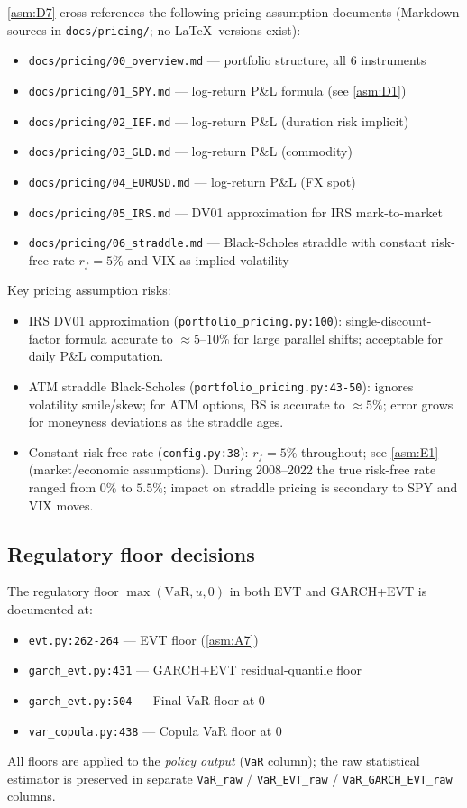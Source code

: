 \documentclass[11pt,a4paper]{article}
\newcommand{\code}[1]{\texttt{#1}}
\begin{document}
\cref{asm:D7} cross-references the following pricing assumption documents
(Markdown sources in \code{docs/pricing/}; no \LaTeX\ versions exist):

\begin{itemize}
  \item \code{docs/pricing/00\_overview.md} --- portfolio structure, all 6 instruments
  \item \code{docs/pricing/01\_SPY.md} --- log-return P\&L formula (see \cref{asm:D1})
  \item \code{docs/pricing/02\_IEF.md} --- log-return P\&L (duration risk implicit)
  \item \code{docs/pricing/03\_GLD.md} --- log-return P\&L (commodity)
  \item \code{docs/pricing/04\_EURUSD.md} --- log-return P\&L (FX spot)
  \item \code{docs/pricing/05\_IRS.md} --- DV01 approximation for IRS mark-to-market
  \item \code{docs/pricing/06\_straddle.md} --- Black-Scholes straddle with constant
    risk-free rate $r_f = 5\%$ and VIX as implied volatility
\end{itemize}

Key pricing assumption risks:
\begin{itemize}
  \item IRS DV01 approximation (\code{portfolio\_pricing.py:100}): single-discount-factor
    formula accurate to $\approx 5$--$10\%$ for large parallel shifts; acceptable for
    daily P\&L computation.
  \item ATM straddle Black-Scholes (\code{portfolio\_pricing.py:43-50}): ignores
    volatility smile/skew; for ATM options, BS is accurate to $\approx 5\%$; error
    grows for moneyness deviations as the straddle ages.
  \item Constant risk-free rate (\code{config.py:38}): $r_f = 5\%$ throughout;
    see \cref{asm:E1} (market/economic assumptions). During 2008--2022 the true
    risk-free rate ranged from $0\%$ to $5.5\%$; impact on straddle pricing is
    secondary to SPY and VIX moves.
\end{itemize}

\subsection{Regulatory floor decisions}

The regulatory floor $\max(\text{VaR}, u, 0)$ in both EVT and GARCH+EVT
is documented at:
\begin{itemize}
  \item \code{evt.py:262-264} --- EVT floor (\cref{asm:A7})
  \item \code{garch\_evt.py:431} --- GARCH+EVT residual-quantile floor
  \item \code{garch\_evt.py:504} --- Final VaR floor at 0
  \item \code{var\_copula.py:438} --- Copula VaR floor at 0
\end{itemize}
All floors are applied to the \emph{policy output} (\code{VaR} column);
the raw statistical estimator is preserved in separate \code{VaR\_raw} /
\code{VaR\_EVT\_raw} / \code{VaR\_GARCH\_EVT\_raw} columns.
\end{document}
